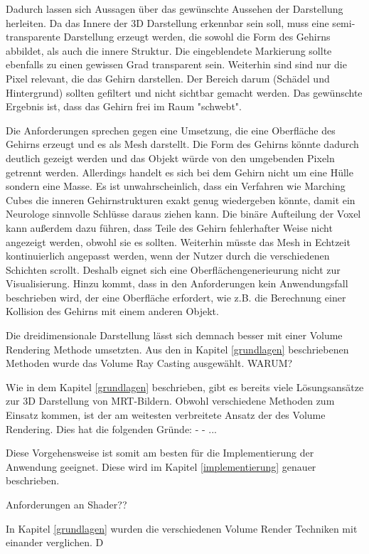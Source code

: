 Dadurch lassen sich Aussagen über das gewünschte Aussehen der Darstellung herleiten.
Da das Innere der 3D Darstellung erkennbar sein soll, muss eine semi-transparente Darstellung erzeugt werden, die sowohl die Form des Gehirns abbildet, als auch die innere Struktur. Die eingeblendete Markierung sollte ebenfalls zu einen gewissen Grad transparent sein.
Weiterhin sind sind nur die Pixel relevant, die das Gehirn darstellen. Der Bereich darum (Schädel und Hintergrund) sollten gefiltert  und nicht sichtbar gemacht werden. Das gewünschte Ergebnis ist, dass das Gehirn frei im Raum "schwebt". 

Die Anforderungen sprechen gegen eine Umsetzung, die eine Oberfläche des Gehirns erzeugt und es als Mesh darstellt. Die Form des Gehirns könnte dadurch deutlich gezeigt werden und das Objekt würde von den umgebenden Pixeln getrennt werden. 
Allerdings handelt es sich bei dem Gehirn nicht um eine Hülle sondern eine Masse. Es ist unwahrscheinlich, dass ein Verfahren wie Marching Cubes die inneren Gehirnstrukturen exakt genug wiedergeben könnte, damit ein Neurologe sinnvolle Schlüsse daraus ziehen kann. Die binäre Aufteilung der Voxel kann außerdem dazu führen, dass Teile des Gehirn fehlerhafter Weise nicht angezeigt werden, obwohl sie es sollten. Weiterhin müsste das Mesh in Echtzeit kontinuierlich angepasst werden, wenn der Nutzer durch die verschiedenen Schichten scrollt. 
Deshalb eignet sich eine Oberflächengenerieurung nicht zur Visualisierung.
Hinzu kommt, dass in den Anforderungen kein Anwendungsfall beschrieben wird, der eine Oberfläche erfordert, wie z.B. die Berechnung einer Kollision des Gehirns mit einem anderen Objekt.	
	
Die dreidimensionale Darstellung lässt sich demnach besser mit einer Volume Rendering Methode umsetzten. 
Aus den in Kapitel \ref{grundlagen} beschriebenen Methoden wurde das Volume Ray Casting ausgewählt. 
WARUM?

Wie in dem Kapitel \ref{grundlagen} beschrieben, gibt es bereits viele Lösungsansätze zur 3D Darstellung von MRT-Bildern. Obwohl verschiedene Methoden zum Einsatz kommen, ist der am weitesten verbreitete Ansatz der des Volume Rendering.
Dies hat die folgenden Gründe:
- 
- ...
	
Diese Vorgehensweise ist somit am besten für die Implementierung der Anwendung geeignet.
Diese wird im Kapitel \ref{implementierung} genauer beschrieben.

Anforderungen an Shader??

In Kapitel \ref{grundlagen} wurden die verschiedenen Volume Render Techniken mit einander verglichen. D

